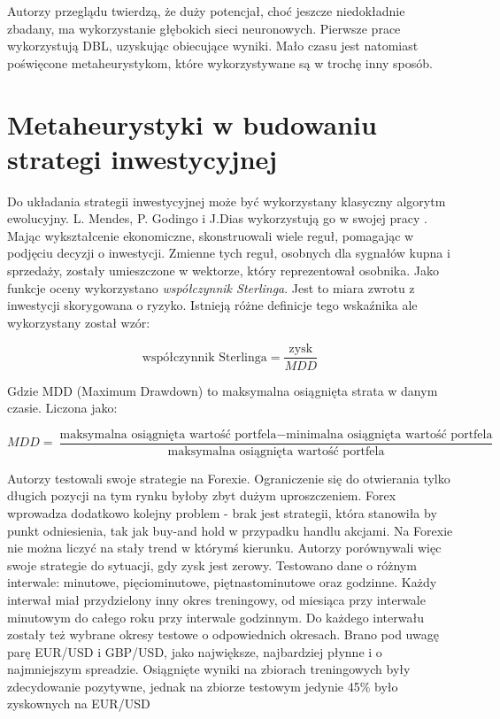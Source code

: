 \documentclass[twoside]{iisthesis}
\begin{document}
Autorzy przeglądu \cite{Cavalcante2016194} twierdzą, że duży potencjał, choć jeszcze niedokładnie zbadany, ma wykorzystanie głębokich sieci neuronowych. Pierwsze prace wykorzystują DBL, uzyskując obiecujące wyniki. Mało czasu jest natomiast poświęcone metaheurystykom, które wykorzystywane są w trochę inny sposób.





\section{Metaheurystyki w budowaniu strategi inwestycyjnej}

Do układania strategii inwestycyjnej może być wykorzystany klasyczny algorytm ewolucyjny. L. Mendes, P. Godingo i J.Dias wykorzystują go w swojej pracy \cite{Mendes2012}. Mając wykształcenie ekonomiczne, skonstruowali wiele reguł, pomagając w podjęciu decyzji o inwestycji. Zmienne tych reguł, osobnych dla sygnałów kupna i sprzedaży, zostały umieszczone w wektorze, który reprezentował osobnika. Jako funkcje oceny wykorzystano \textit{współczynnik Sterlinga}. Jest to miara zwrotu z inwestycji skorygowana o ryzyko. Istnieją różne definicje tego wskaźnika ale wykorzystany został wzór:

\[\text{współczynnik Sterlinga}=\frac{\text{zysk}}{MDD}\]

Gdzie MDD (Maximum Drawdown) to maksymalna osiągnięta strata w danym czasie. Liczona jako:

\[MDD=\frac{\text{maksymalna osiągnięta wartość portfela} - \text{minimalna osiągnięta wartość portfela}}{\text{maksymalna osiągnięta wartość portfela}}\]

Autorzy testowali swoje strategie na Forexie. Ograniczenie się do otwierania tylko długich pozycji na tym rynku byłoby zbyt dużym uproszczeniem. Forex wprowadza dodatkowo kolejny problem - brak jest strategii, która stanowiła by punkt odniesienia, tak jak buy-and hold w przypadku handlu akcjami. Na Forexie nie można liczyć na stały trend w którymś kierunku. Autorzy porównywali więc swoje strategie do sytuacji, gdy zysk jest zerowy. Testowano dane o różnym interwale: minutowe, pięciominutowe, piętnastominutowe oraz godzinne. Każdy interwał miał przydzielony inny okres treningowy, od miesiąca przy interwale minutowym do całego roku przy interwale godzinnym. Do każdego interwału zostały też wybrane okresy testowe o odpowiednich okresach. Brano pod uwagę parę EUR/USD i GBP/USD, jako największe, najbardziej płynne i o najmniejszym spreadzie. Osiągnięte wyniki na zbiorach treningowych były zdecydowanie pozytywne, jednak na zbiorze testowym jedynie 45\% było zyskownych na EUR/USD
\end{document}
